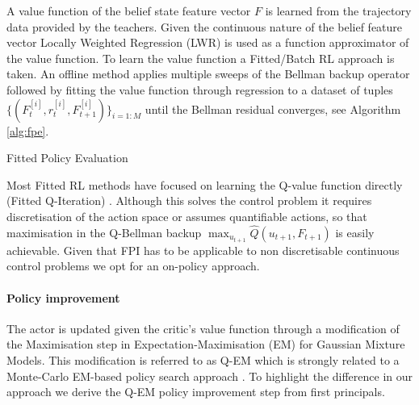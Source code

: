 \documentclass[final,5p,times,twocolumn]{elsarticle}
\makeatletter
\newcommand{\removelatexerror}{\let\@latex@error\@gobble}
\makeatother
\begin{document}
A value function of the belief state feature vector $F$ is  learned from the 
trajectory data provided by the teachers. Given the continuous nature of the belief feature vector Locally Weighted Regression
(LWR) \cite{Atkeson97locallyweighted}  is used as a function approximator of the value function.
To learn the value function a Fitted/Batch RL approach is taken\cite{EGW05}.  An offline method applies multiple 
sweeps of the Bellman backup operator followed by fitting the value function through regression to a dataset of 
tuples $\{(F^{[i]}_t,r^{[i]}_t,F^{[i]}_{t+1})\}_{i=1:M}$ until the Bellman residual 
converges, see Algorithm \ref{alg:fpe}.

\begin{center}
\begin{minipage}{\linewidth}
\removelatexerror%
\begin{algorithm*}[H]
\label{alg:fpe}
\BlankLine
{}
\caption{Fitted Policy Evaluation}
\end{algorithm*} 
\end{minipage}
\end{center}

Most Fitted RL methods have focused on learning the Q-value function directly (Fitted Q-Iteration) 
\cite{fqi_nips_peter_2009,EGW05,Riedmiller2005}. Although this solves the control problem it requires discretisation 
of the action space or assumes quantifiable actions, so that maximisation in the Q-Bellman backup
${\max_{u_{t+1}} \hat{Q}(u_{t+1},F_{t+1})}$ is easily achievable. Given that FPI has to be applicable to 
non discretisable continuous control problems we opt for an on-policy approach.

\paragraph{Policy improvement}

The actor is updated given the critic's value function through a modification of the Maximisation step in  Expectation-Maximisation (EM) 
for Gaussian Mixture Models. This modification is referred to as Q-EM which is strongly related to a Monte-Carlo EM-based policy 
search approach \cite[p.50]{p_search_surv_2011}. To highlight the difference in our approach we derive the Q-EM policy improvement step
from first principals.
\end{document}
